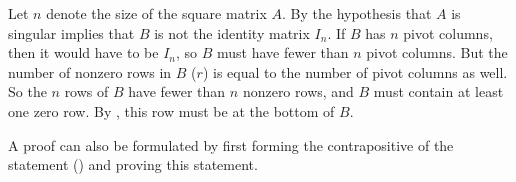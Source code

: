 Let $n$ denote the size of the square matrix $A$.  By  the hypothesis that $A$ is singular implies that $B$ is not the identity matrix $I_n$.  If $B$ has $n$ pivot columns, then it would have to be $I_n$, so $B$ must have fewer than $n$ pivot columns.  But the number of nonzero rows in $B$ ($r$) is equal to the number of pivot columns as well.  So the $n$ rows of $B$ have fewer than $n$ nonzero rows, and $B$ must contain at least one zero row.  By , this row must be at the bottom of $B$.\par
%
A proof can also be formulated by first forming the contrapositive of the statement () and proving this statement.
